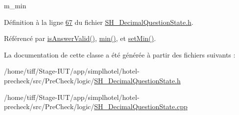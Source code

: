 m\-\_\-min 



Définition à la ligne \hyperlink{SH__DecimalQuestionState_8h_source_l00067}{67} du fichier \hyperlink{SH__DecimalQuestionState_8h_source}{S\-H\-\_\-\-Decimal\-Question\-State.\-h}.



Référencé par \hyperlink{classSH__DecimalQuestionState_a99f815a5101340867400f093e89f2210}{is\-Answer\-Valid()}, \hyperlink{classSH__DecimalQuestionState_ac909214eeb0e370c16718cb698bfec2c}{min()}, et \hyperlink{classSH__DecimalQuestionState_a2b0fa48a8e0609bb2db7776ce1240a86}{set\-Min()}.



La documentation de cette classe a été générée à partir des fichiers suivants \-:\begin{DoxyCompactItemize}
\item 
/home/tiff/\-Stage-\/\-I\-U\-T/app/simplhotel/hotel-\/precheck/src/\-Pre\-Check/logic/\hyperlink{SH__DecimalQuestionState_8h}{S\-H\-\_\-\-Decimal\-Question\-State.\-h}\item 
/home/tiff/\-Stage-\/\-I\-U\-T/app/simplhotel/hotel-\/precheck/src/\-Pre\-Check/logic/\hyperlink{SH__DecimalQuestionState_8cpp}{S\-H\-\_\-\-Decimal\-Question\-State.\-cpp}\end{DoxyCompactItemize}
